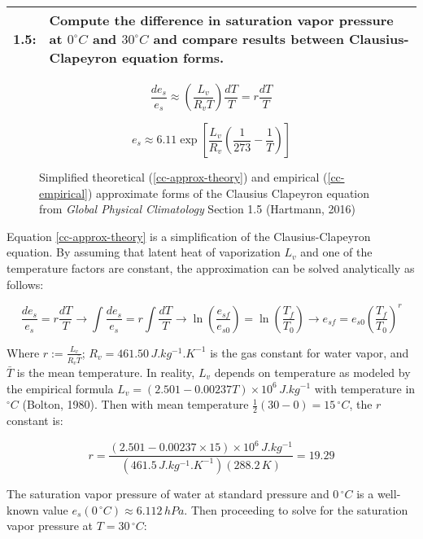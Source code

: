 \documentclass[12pt]{article}
\newcommand*{\problem}[2]{
    \begin{table}[ht]
    \centering
        \begin{tabular}{ | p{.1\linewidth} p{.9\linewidth} | }
            \hline
            \vspace{.3em}\textbf{\large#1:} & \vspace{.3em}\small{#2}\hspace{.2em}\vspace{.5em} \\ \hline
        \end{tabular}
    \end{table}
}
\begin{document}
\problem{1.5}{Compute the difference in saturation vapor pressure at $0^\circ \si{C}$ and $30^\circ \si{C}$ and compare results between Clausius-Clapeyron equation forms.}

\begin{figure}[h!]
    \begin{equation}\label{cc-approx-theory}
        \frac{de_s}{e_s} \approx \left(\frac{L_v}{R_vT}\right)\frac{dT}{T} = r\frac{dT}{T}
    \end{equation}

    \begin{equation}\label{cc-empirical}
        e_s \approx 6.11\exp\left[\frac{L_v}{R_v}\left(\frac{1}{273}-\frac{1}{T}\right)\right]
    \end{equation}

    \caption{Simplified theoretical (\ref{cc-approx-theory}) and empirical (\ref{cc-empirical}) approximate forms of the Clausius Clapeyron equation from \textit{Global Physical Climatology} Section 1.5 (Hartmann, 2016)}
\end{figure}

Equation \ref{cc-approx-theory} is a simplification of the Clausius-Clapeyron equation. By assuming that latent heat of vaporization $L_v$ and one of the temperature factors are constant, the approximation can be solved analytically as follows:

\[
    \frac{de_s}{e_s} = r\frac{dT}{T} \rightarrow \int\frac{de_s}{e_s} = r\int\frac{dT}{T} \rightarrow \ln\left(\frac{e_{sf}}{e_{s0}}\right) = \ln\left(\frac{T_{f}}{T_{0}}\right) \rightarrow \boxed{e_{sf} = e_{s0} \left(\frac{T_f}{T_0}\right)^r}
\]

Where $r := \frac{L_v}{R_v\bar{T}}$; $R_v=461.50\,\si{J.kg^{-1}.K^{-1}}$ is the gas constant for water vapor, and $\bar{T}$ is the mean temperature. In reality, $L_v$ depends on temperature as modeled by the empirical formula $L_v = (2.501-0.00237T)\times 10^6\,\si{J.kg^{-1}}$ with temperature in $^\circ\si{C}$ (Bolton, 1980). Then with mean temperature $\frac{1}{2}(30-0) = 15\,^\circ\si{C}$, the $r$ constant is:

\[
    r = \frac{\left(2.501-0.00237\times15\right)\times10^6\,\si{J.kg^{-1}}}{(461.5\,\si{J.kg^{-1}.K^{-1}})(288.2\,\si{K})} = 19.29
\]

The saturation vapor pressure of water at standard pressure and $0\,^\circ\si{C}$ is a well-known value $e_s(0\,^\circ\si{C}) \approx 6.112\,\si{hPa}$. Then proceeding to solve for the saturation vapor pressure at $T = 30\,^\circ\si{C}$:
\end{document}
